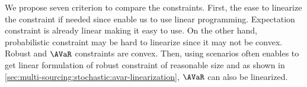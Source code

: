 


We propose seven criterion to compare the constraints.
First, the ease to linearize the constraint if needed since enable us to use linear programming.
Expectation constraint is already linear making it easy to use.
On the other hand, probabilistic constraint may be hard to linearize since it may not be convex.
Robust and $\AVaR$ constraints are convex.
Then, using scenarios often enables to get linear formulation of robust constraint of reasonable size and as shown in \cref{sec:multi-sourcing:stochastic:avar-linearization}, $\AVaR$ can also be linearized.


